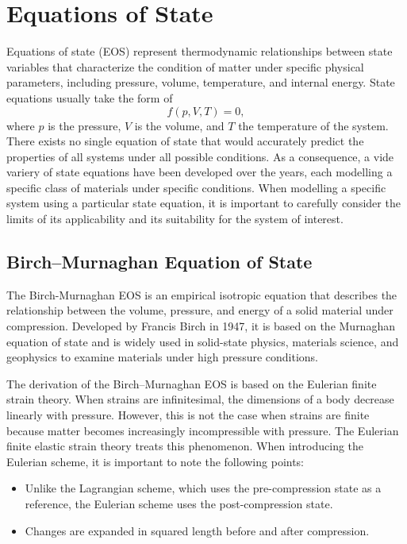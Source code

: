 \chapter{Equations of State}

Equations of state (EOS) represent thermodynamic relationships between state
variables that characterize the condition of matter under specific physical
parameters, including pressure, volume, temperature, and internal energy.
State equations usually take the form of
\begin{equation}
  f(p, V, T) = 0,
\end{equation}
where $p$ is the pressure, $V$ is the volume, and $T$ the temperature of the
system. There exists no single equation of state that would accurately
predict the properties of all systems under all possible conditions. As a
consequence, a vide variery of state equations have been developed over the
years, each modelling a specific class of materials under specific conditions.
When modelling a specific system using a particular state equation, it is
important to carefully consider the limits of its applicability and its
suitability for the system of interest.

\section{Birch--Murnaghan Equation of State}

The Birch-Murnaghan EOS is an empirical isotropic equation that describes the
relationship between the volume, pressure, and energy of a solid material
under compression. Developed by Francis Birch in 1947, it is based on the
Murnaghan equation of state and is widely used in solid-state physics,
materials science, and geophysics to examine materials under high pressure
conditions.

The derivation of the Birch--Murnaghan EOS is based on the Eulerian finite
strain theory. When strains are infinitesimal, the dimensions of a body
decrease linearly with pressure. However, this is not the case when strains
are finite because matter becomes increasingly incompressible with pressure.
The Eulerian finite elastic strain theory treats this phenomenon. When
introducing the Eulerian scheme, it is important to note the following points:
\begin{itemize}
  \item Unlike the Lagrangian scheme, which uses the pre-compression state as
  a reference, the Eulerian scheme uses the post-compression state.
  \item Changes are expanded in squared length before and after compression.
\end{itemize}

